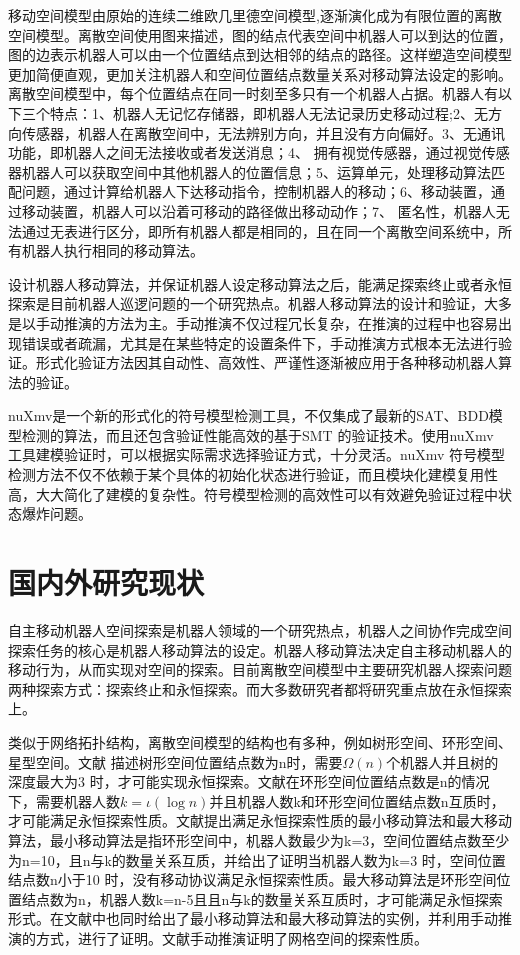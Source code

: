 移动空间模型由原始的连续二维欧几里德空间模型,逐渐演化成为有限位置的离散空间模型。离散空间使用图来描述，图的结点代表空间中机器人可以到达的位置，图的边表示机器人可以由一个位置结点到达相邻的结点的路径。这样塑造空间模型更加简便直观，更加关注机器人和空间位置结点数量关系对移动算法设定的影响。离散空间模型中，每个位置结点在同一时刻至多只有一个机器人占据。机器人有以下三个特点：1、机器人无记忆存储器，即机器人无法记录历史移动过程;2、无方向传感器，机器人在离散空间中，无法辨别方向，并且没有方向偏好。3、无通讯功能，即机器人之间无法接收或者发送消息；4、 拥有视觉传感器，通过视觉传感器机器人可以获取空间中其他机器人的位置信息；5、运算单元，处理移动算法匹配问题，通过计算给机器人下达移动指令，控制机器人的移动；6、移动装置，通过移动装置，机器人可以沿着可移动的路径做出移动动作；7、 匿名性，机器人无法通过无表进行区分，即所有机器人都是相同的，且在同一个离散空间系统中，所有机器人执行相同的移动算法。

设计机器人移动算法，并保证机器人设定移动算法之后，能满足探索终止或者永恒探索是目前机器人巡逻问题的一个研究热点。机器人移动算法的设计和验证，大多是以手动推演的方法为主。手动推演不仅过程冗长复杂，在推演的过程中也容易出现错误或者疏漏，尤其是在某些特定的设置条件下，手动推演方式根本无法进行验证。形式化验证方法因其自动性、高效性、严谨性逐渐被应用于各种移动机器人算法的验证。

nuXmv是一个新的形式化的符号模型检测工具，不仅集成了最新的SAT、BDD模型检测的算法，而且还包含验证性能高效的基于SMT 的验证技术。使用nuXmv 工具建模验证时，可以根据实际需求选择验证方式，十分灵活。nuXmv 符号模型检测方法不仅不依赖于某个具体的初始化状态进行验证，而且模块化建模复用性高，大大简化了建模的复杂性。符号模型检测的高效性可以有效避免验证过程中状态爆炸问题。

\section{国内外研究现状}
自主移动机器人空间探索\cite{r1}\cite{r2}是机器人领域的一个研究热点，机器人之间协作完成空间探索任务的核心是机器人移动算法\cite{r1}\cite{r3}\cite{r4}\cite{r5}的设定。机器人移动算法决定自主移动机器人的移动行为，从而实现对空间的探索。目前离散空间模型中主要研究机器人探索问题两种探索方式：探索终止\cite{r6}\cite{r7}\cite{r8}和永恒探索\cite{r9}。而大多数研究者都将研究重点放在永恒探索上。

类似于网络拓扑结构，离散空间模型的结构也有多种，例如树形空间、环形空间、星型空间。文献\cite{r8} 描述树形空间位置结点数为n时，需要$\Omega\left(n\right)$个机器人并且树的深度最大为3 时，才可能实现永恒探索。文献\cite{r7}在环形空间位置结点数是n的情况下，需要机器人数$k = \iota\left(\log n\right)$并且机器人数k和环形空间位置结点数n互质时，才可能满足永恒探索性质。文献\cite{r5}提出满足永恒探索性质的最小移动算法和最大移动算法，最小移动算法是指环形空间中，机器人数最少为k=3，空间位置结点数至少为n=10，且n与k的数量关系互质，并给出了证明当机器人数为k=3 时，空间位置结点数n小于10 时，没有移动协议满足永恒探索性质。最大移动算法是环形空间位置结点数为n，机器人数k=n-5且且n与k的数量关系互质时，才可能满足永恒探索形式。在文献\cite{r5}中也同时给出了最小移动算法和最大移动算法的实例，并利用手动推演的方式，进行了证明。文献\cite{r10}\cite{r11}手动推演证明了网格空间的探索性质。

